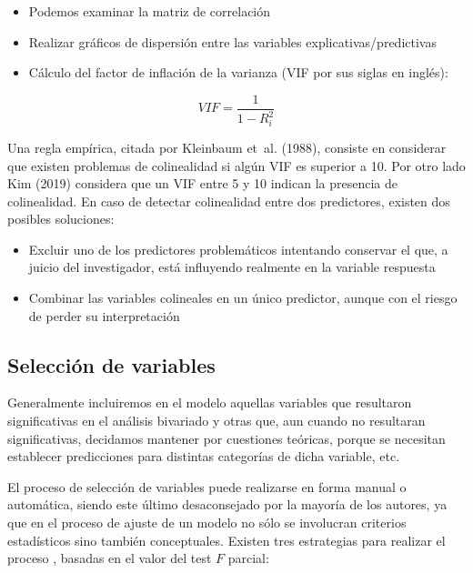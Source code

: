 \documentclass[
  spanish,
  a4paper,
]{scrbook}
\begin{document}
\begin{itemize}
\item
  Podemos examinar la matriz de correlación
\item
  Realizar gráficos de dispersión entre las variables
  explicativas/predictivas
\item
  Cálculo del factor de inflación de la varianza (VIF por sus siglas en
  inglés):
\end{itemize}

\[
VIF = \frac{1}{1-R^2_i}
\]

Una regla empírica, citada por Kleinbaum et~al. (1988), consiste en
considerar que existen problemas de colinealidad si algún VIF es
superior a 10. Por otro lado Kim (2019) considera que un VIF entre 5 y
10 indican la presencia de colinealidad. En caso de detectar
colinealidad entre dos predictores, existen dos posibles soluciones:

\begin{itemize}
\item
  Excluir uno de los predictores problemáticos intentando conservar el
  que, a juicio del investigador, está influyendo realmente en la
  variable respuesta
\item
  Combinar las variables colineales en un único predictor, aunque con el
  riesgo de perder su interpretación
\end{itemize}

\subsection{Selección de variables}\label{selecciuxf3n-de-variables}

Generalmente incluiremos en el modelo aquellas variables que resultaron
significativas en el análisis bivariado y otras que, aun cuando no
resultaran significativas, decidamos mantener por cuestiones teóricas,
porque se necesitan establecer predicciones para distintas categorías de
dicha variable, etc.

El proceso de selección de variables puede realizarse en forma manual o
automática, siendo este último desaconsejado por la mayoría de los
autores, ya que en el proceso de ajuste de un modelo no sólo se
involucran criterios estadísticos sino también conceptuales. Existen
tres estrategias para realizar el proceso , basadas en el valor del test
\(F\) parcial:
\end{document}
